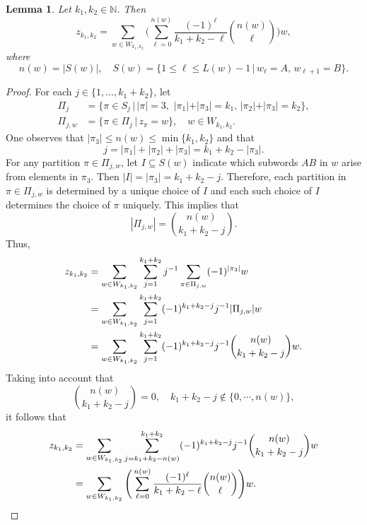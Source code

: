 \documentclass[reqno,10pt,centertags]{amsart}
\newcommand{\bbN}{{\mathbb{N}}}
\newcommand{\no}{\notag}
\newcommand{\lb}{\label}
\let\leq\leqslant
\newcounter{count}
\numberwithin{equation}{section}
\newtheorem{lemma}[theorem]{Lemma}
\theoremstyle{remark}
\begin{document}
\begin{lemma} \lb{lD.3} 
Let $k_1,k_2 \in \bbN$. Then  
\begin{equation} 
z_{k_1,k_2}=\sum_{w\in W_{k_1,k_2}}
\Bigg(\sum_{\ell=0}^{n(w)}\frac{(-1)^{\ell}}{k_1+k_2-\ell}\binom{n(w)}{\ell}\Bigg)w, 
\end{equation} 
where 
\begin{equation} 
n(w)=|S(w)|,\quad S(w)= \{1\leq \ell \leq L(w)-1 \, | \,  w_{\ell}=A,\, w_{\ell +1}=B\}.
\end{equation} 
\end{lemma}
\begin{proof} For each $j\in \{1, \ldots, k_1 + k_2\}$, let
\begin{align} 
\Pi_j &= \{ \pi\in   S_j \, | \, |\pi| = 3,\, \, |\pi_1|+|\pi_3| = k_1, \, |\pi_2|+|\pi_3| = k_2\},    \\
\Pi_{j,w} &=\{ \pi\in \Pi_j \, | \, z_\pi = w\}, \quad w\in W_{k_1,k_2}.
\end{align} 
One observes that $|\pi_3|\leq n(w)\leq \min\{k_1,k_2\}$ and that
\begin{equation} 
j = |\pi_1|+|\pi_2|+|\pi_3| = k_1+k_2-|\pi_3|.
\end{equation} 
For any partition $\pi\in\Pi_{j,w}$, let $I\subseteq S(w)$ indicate which subwords $AB$ in $w$ arise from elements in $\pi_3$.  Then $|I|=|\pi_3|=k_1+k_2-j$.  Therefore, each partition in $\pi\in\Pi_{j,w}$ is determined by a unique choice of $I$ and each such choice of $I$ determines the choice of $\pi$ uniquely. This implies that 
\begin{equation} 
|\Pi_{j,w}| = \binom{n(w)}{k_1+k_2-j}.
\end{equation} 
Thus,
\begin{align} 
z_{k_1,k_2} &=\sum_{w\in W_{k_1,k_2}}\sum_{j=1}^{k_1+k_2} j^{-1} \sum_{\pi\in\Pi_{j,w}} (-1)^{|\pi_3|} w 
\no \\
&=\sum_{w\in W_{k_1,k_2}} \sum_{j=1}^{k_1+k_2} (-1)^{k_1+k_2-j} j^{-1} |\Pi_{j,w}|w    \no \\ 
&=\sum_{w\in W_{k_1,k_2}} \sum_{j=1}^{k_1+k_2} (-1)^{k_1+k_2-j} j^{-1} \binom{n(w)}{k_1+k_2-j}w.
\end{align}
Taking into account that
\begin{equation} 
\binom{n(w)}{k_1+k_2-j}=0,\quad k_1+k_2-j\notin\{0,\cdots,n(w)\},
\end{equation} 
it follows that
\begin{align} 
z_{k_1,k_2} &=\sum_{w\in W_{k_1,k_2}} 
\sum_{j=k_1+k_2-n(w)}^{k_1+k_2} (-1)^{k_1+k_2-j} j^{-1} \binom{n(w)}{k_1+k_2-j}w    \no \\
&=\sum_{w\in W_{k_1,k_2}} 
\Bigg(\sum_{\ell=0}^{n(w)}\frac{(-1)^{\ell}}{k_1+k_2-\ell}\binom{n(w)}{\ell}\Bigg)w.
\end{align} 
\end{proof}
\end{document}
